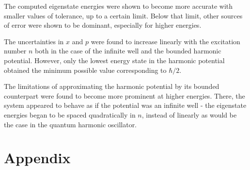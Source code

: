 \documentclass[11pt]{article}
\begin{document}
The computed eigenstate energies were shown to become more accurate
with smaller values of tolerance, up to a certain limit.
Below that limit, other sources of error were shown to be dominant,
especially for higher energies. 

The uncertainties in $x$ and $p$ were found to increase linearly
with the excitation number $n$ both in the case of the infinite well
and the bounded harmonic potential. However, only the lowest energy
state in the harmonic potential obtained the minimum possible value
corresponding to $\hbar/2$.

The limitations of approximating the harmonic potential by its 
bounded counterpart were found to become more prominent at higher
energies. There, the system appeared to behave as if the potential
was an infinite well - the eigenstate energies began to be spaced
quadratically in $n$, instead of linearly as would be the case in
the quantum harmonic oscillator.




\pagebreak

\section{Appendix}
\end{document}
